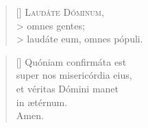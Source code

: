 \documentclass[omni.tex]{subfiles}
\begin{document}
\settowidth{\versewidth}{Et ne nos ind\'ucas in tentati\'onem}

\begin{verse}[\versewidth]
\lettrine[lhang=1.0,nindent=0em]{L}{aud\'ate D\'ominum}, \\> 
omnes gentes; \\>
laud\'ate eum, omnes p\'opuli.
\end{verse}

\begin{verse}[\versewidth]
Qu\'oniam confirm\'ata est \\
super nos miseric\'ordia eius, \\
et v\'eritas D\'omini manet \\
in \ae t\'ernum. \\
Amen. \\[6\baselineskip]
\end{verse}

\pagebreak
\end{document}
